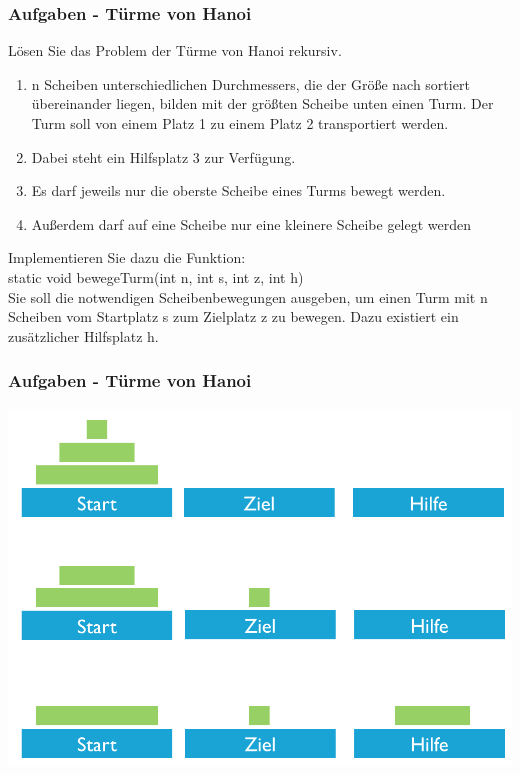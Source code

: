 \begin{frame}
	\frametitle{Aufgaben - Türme von Hanoi}
	  Lösen Sie das Problem der Türme von Hanoi rekursiv.
	  \begin{enumerate}
	  	\item n Scheiben unterschiedlichen Durchmessers, die der Größe nach
	  	sortiert übereinander liegen, bilden mit der größten Scheibe unten einen
	  	Turm. Der Turm soll von einem Platz 1 zu einem Platz 2 transportiert werden.
		\item Dabei steht ein Hilfsplatz 3 zur Verfügung.
 		\item Es darf jeweils nur die oberste Scheibe eines Turms bewegt werden.
 		\item Außerdem darf auf eine Scheibe nur eine kleinere Scheibe gelegt werden
	  \end{enumerate}
	  Implementieren Sie dazu die Funktion:\\
	  static void bewegeTurm(int n, int s, int z, int h)\\
	  Sie soll die notwendigen Scheibenbewegungen ausgeben, um einen Turm mit n
	  Scheiben vom Startplatz s zum Zielplatz z zu bewegen. Dazu existiert
	  ein zusätzlicher Hilfsplatz h.
\end{frame}

\begin{frame}
	\frametitle{Aufgaben - Türme von Hanoi}
	\center
	\includegraphics[width=1\textwidth, keepaspectratio=true]{bilder/hanoi1.png}
\end{frame}

